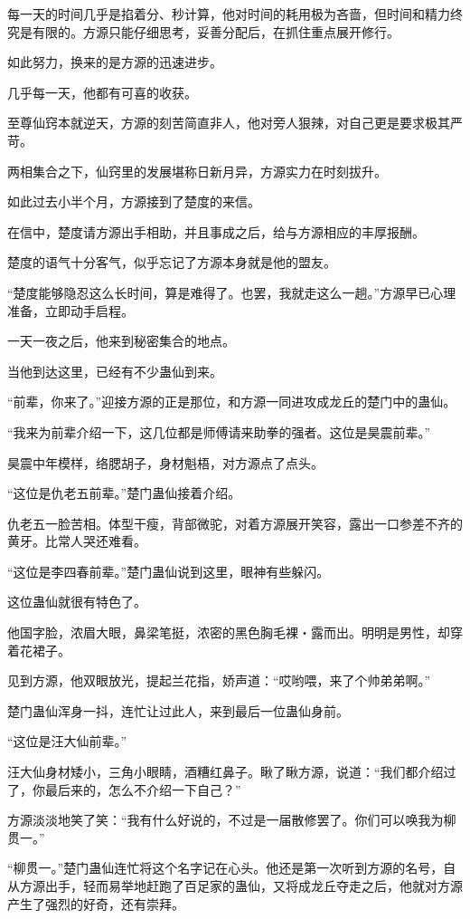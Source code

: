 \begin{this_body}
每一天的时间几乎是掐着分、秒计算，他对时间的耗用极为吝啬，但时间和精力终究是有限的。方源只能仔细思考，妥善分配后，在抓住重点展开修行。

如此努力，换来的是方源的迅速进步。

几乎每一天，他都有可喜的收获。

至尊仙窍本就逆天，方源的刻苦简直非人，他对旁人狠辣，对自己更是要求极其严苛。

两相集合之下，仙窍里的发展堪称日新月异，方源实力在时刻拔升。

如此过去小半个月，方源接到了楚度的来信。

在信中，楚度请方源出手相助，并且事成之后，给与方源相应的丰厚报酬。

楚度的语气十分客气，似乎忘记了方源本身就是他的盟友。

“楚度能够隐忍这么长时间，算是难得了。也罢，我就走这么一趟。”方源早已心理准备，立即动手启程。

一天一夜之后，他来到秘密集合的地点。

当他到达这里，已经有不少蛊仙到来。

“前辈，你来了。”迎接方源的正是那位，和方源一同进攻成龙丘的楚门中的蛊仙。

“我来为前辈介绍一下，这几位都是师傅请来助拳的强者。这位是昊震前辈。”

昊震中年模样，络腮胡子，身材魁梧，对方源点了点头。

“这位是仇老五前辈。”楚门蛊仙接着介绍。

仇老五一脸苦相。体型干瘦，背部微驼，对着方源展开笑容，露出一口参差不齐的黄牙。比常人哭还难看。

“这位是李四春前辈。”楚门蛊仙说到这里，眼神有些躲闪。

这位蛊仙就很有特色了。

他国字脸，浓眉大眼，鼻梁笔挺，浓密的黑色胸毛裸・露而出。明明是男性，却穿着花裙子。

见到方源，他双眼放光，提起兰花指，娇声道：“哎哟喂，来了个帅弟弟啊。”

楚门蛊仙浑身一抖，连忙让过此人，来到最后一位蛊仙身前。

“这位是汪大仙前辈。”

汪大仙身材矮小，三角小眼睛，酒糟红鼻子。瞅了瞅方源，说道：“我们都介绍过了，你最后来的，怎么不介绍一下自己？”

方源淡淡地笑了笑：“我有什么好说的，不过是一届散修罢了。你们可以唤我为柳贯一。”

“柳贯一。”楚门蛊仙连忙将这个名字记在心头。他还是第一次听到方源的名号，自从方源出手，轻而易举地赶跑了百足家的蛊仙，又将成龙丘夺走之后，他就对方源产生了强烈的好奇，还有崇拜。


\end{this_body}
